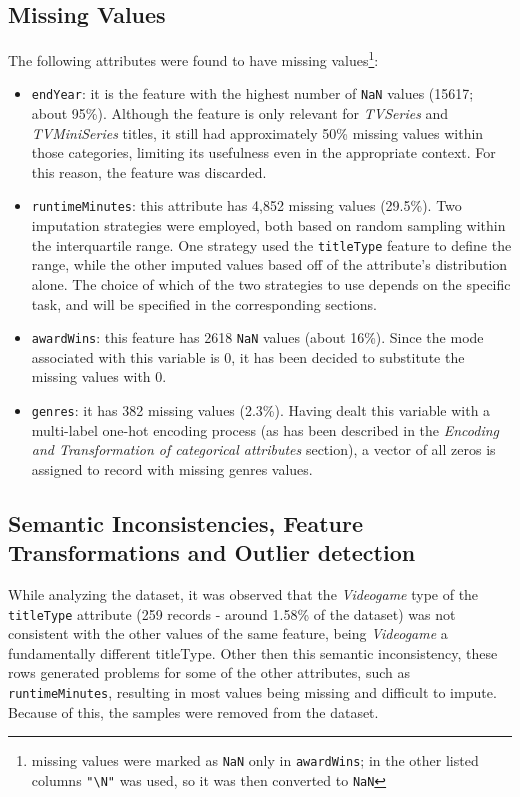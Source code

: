 \subsection{Missing Values}\label{sec:missing_values}
The following attributes were found to have missing values\footnote{missing values were marked as \texttt{NaN}
only in \texttt{awardWins}; in the other listed columns \texttt{"\textbackslash N"} was used, so it was then converted to \texttt{NaN}}:
\begin{itemize}
    \item \texttt{endYear}: it is the feature with the highest number of \texttt{NaN} values (15617; about 95\%).
    Although the feature is only relevant for \textit{TVSeries} and \textit{TVMiniSeries} titles, it still
    had approximately 50\% missing values within those categories, limiting its usefulness even in the
    appropriate context. For this reason, the feature was discarded.
    \vspace{1em}
    
    \item \texttt{runtimeMinutes}: this attribute has 4,852 missing values (29.5\%). Two imputation strategies were employed, both based on random sampling within the interquartile range. 
    One strategy used the \texttt{titleType} feature to define the range, while the other imputed values based off of the attribute's distribution alone. 
    The choice of which of the two strategies to use depends on the specific task, and will be specified in the corresponding sections.
    
    \item \texttt{awardWins}: this feature has 2618 \texttt{NaN} values (about 16\%).
    Since the mode associated with this variable is 0, it has been decided to substitute the missing
    values with 0.

    \item \texttt{genres}: it has 382 missing values (2.3\%). Having dealt this variable with a
    multi-label one-hot encoding process (as has been described in the \textit{Encoding and Transformation of categorical attributes}
    section), a vector of all zeros is assigned to record with missing genres values.
\end{itemize}



\subsection{Semantic Inconsistencies, Feature Transformations and Outlier detection}
While analyzing the dataset, it was observed that the \textit{Videogame} type of the \texttt{titleType} attribute (259 records - around 1.58\% of the dataset) 
was not consistent with the other values of the same feature, being \textit{Videogame} a fundamentally different titleType.
Other then this semantic inconsistency, these rows generated problems for some of the other attributes, such as \texttt{runtimeMinutes}, resulting in most values being missing and difficult to impute. 
Because of this, the samples were removed from the dataset. \\


